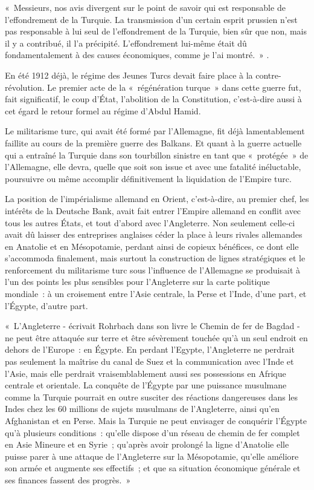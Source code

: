 \documentclass[french,twoside]{book} %
\newenvironment{quoteblock}%
  {\begin{quoting}}
  {\end{quoting}}
\newenvironment{quotebar}{%
    \def\FrameCommand{{\color{rubric!10!}\vrule width 0.5em} \hspace{0.9em}}%
    \def\OuterFrameSep{\itemsep} %
    \MakeFramed {\advance\hsize-\width \FrameRestore}
  }%
  {%
    \endMakeFramed
  }
\renewenvironment{quoteblock}%
  {%
    \savenotes
    \setstretch{0.9}
    \normalfont
    \begin{quotebar}
  }
  {%
    \end{quotebar}
    \spewnotes
  }
\begin{document}
{ « Messieurs, nos avis divergent sur le point de savoir qui est responsable de l’effondrement de la Turquie. La transmission d’un certain esprit prussien n’est pas responsable à lui seul de l’effondrement de la Turquie, bien sûr que non, mais il y a contribué, il l’a précipité. L'effondrement lui-même était dû fondamentalement à des causes économiques, comme je l’ai montré. »
}.\par
En été 1912 déjà, le régime des Jeunes Turcs devait faire place à la contre-révolution. Le premier acte de la « régénération turque » dans cette guerre fut, fait significatif, le coup d’État, l’abolition de la Constitution, c’est-à-dire aussi à cet égard le retour formel au régime d’Abdul Hamid.\par
Le militarisme turc, qui avait été formé par l’Allemagne, fit déjà lamentablement faillite au cours de la première guerre des Balkans. Et quant à la guerre actuelle qui a entraîné la Turquie dans son tourbillon sinistre en tant que « protégée » de l’Allemagne, elle devra, quelle que soit son issue et avec une fatalité inéluctable, poursuivre ou même accomplir définitivement la liquidation de l’Empire turc.\par
  La position de l’impérialisme allemand en Orient, c’est-à-dire, au premier chef, les intérêts de la Deutsche Bank, avait fait entrer l’Empire allemand en conflit avec tous les autres États, et tout d’abord avec l’Angleterre. Non seulement celle-ci avait dû laisser des entreprises anglaises céder la place à leurs rivales allemandes en Anatolie et en Mésopotamie, perdant ainsi de copieux bénéfices, ce dont elle s’accommoda finalement, mais surtout la construction de lignes stratégiques et le renforcement du militarisme turc sous l’influence de l’Allemagne se produisait à l’un des points les plus sensibles pour l’Angleterre sur la carte politique mondiale : à un croisement entre l’Asie centrale, la Perse et l’Inde, d’une part, et l’Égypte, d’autre part.\par

\begin{quoteblock}
 \noindent « L'Angleterre - écrivait Rohrbach dans son livre le Chemin de fer de Bagdad - ne peut être attaquée sur terre et être sévèrement touchée qu’à un seul endroit en dehors de l’Europe : en Égypte. En perdant l’Egypte, l’Angleterre ne perdrait pas seulement la maîtrise du canal de Suez et la communication avec l’Inde et l’Asie, mais elle perdrait vraisemblablement aussi ses possessions en Afrique centrale et orientale. La conquête de l’Égypte par une puissance musulmane comme la Turquie pourrait en outre susciter des réactions dangereuses dans les Indes chez les 60 millions de sujets musulmans de l’Angleterre, ainsi qu’en Afghanistan et en Perse. Mais la Turquie ne peut envisager de conquérir l’Égypte qu’à plusieurs conditions : qu’elle dispose d’un réseau de chemin de fer complet en Asie Mineure et en Syrie ; qu’après avoir prolongé la ligne d’Anatolie elle puisse parer à une attaque de l’Angleterre sur la Mésopotamie, qu’elle améliore son armée et augmente ses effectifs ; et que sa situation économique générale et ses finances fassent des progrès. »
\end{quoteblock}
\end{document}
